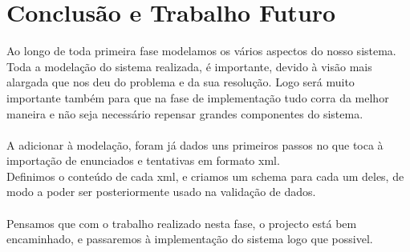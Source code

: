 \chapter{Conclusão e Trabalho Futuro}\label{chap con} 
Ao longo de toda primeira fase modelamos os vários aspectos do nosso sistema.
Toda a modelação do sistema realizada, é importante, devido à visão mais alargada que nos deu do problema e da sua resolução.
Logo será muito importante também para que na fase de implementação tudo corra da melhor maneira e não seja necessário repensar grandes componentes
do sistema.\\ 
\\
A adicionar à modelação, foram já dados uns primeiros passos no que toca à importação de enunciados e tentativas em formato xml.\\
Definimos o conteúdo de cada xml, e criamos um schema para cada um deles, de modo a poder ser posteriormente usado na validação de dados.\\
\\
Pensamos que com o trabalho realizado nesta fase, o projecto está bem encaminhado, e passaremos à implementação do sistema logo que possivel.

